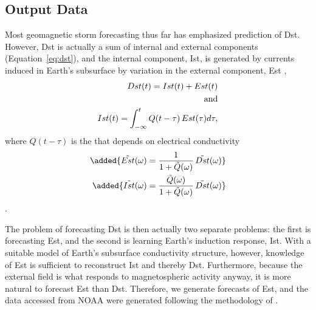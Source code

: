 \subsection{Output Data}
Most geomagnetic storm forecasting thus far has emphasized prediction of Dst. However, Dst is actually a sum of internal and external components (Equation~\ref{eq:dst}), and the internal component, Ist, is generated by currents induced in Earth's subsurface by variation in the external component, Est \citep{Maus2004} ,
\begin{eqnarray}
    Dst(t) = Ist(t) + Est(t) \label{eq:dst}\\
    \textnormal{and}\nonumber \\
    Ist(t) = \int_{-\infty}^t Q(t-\tau)\,Est(\tau) d\tau \label{eq:ist},
\end{eqnarray}
where $Q(t-\tau)$ is the  that depends on  electrical conductivity \added{$\sigma$}
\begin{eqnarray}
    \added{\tilde{Est}(\omega) = \frac{1}{1+\tilde{Q}(\omega)}\,\tilde{Dst}(\omega)} \\
    \added{\tilde{Ist}(\omega) = \frac{\tilde{Q}(\omega)}{1+\tilde{Q}(\omega)}\,\tilde{Dst}(\omega)}
\end{eqnarray}
 \cite{Maus2004, Olsen2005, Grayver2020}.

The problem of forecasting Dst is then actually two separate problems: the first is forecasting Est, and the second is learning Earth's induction response, Ist. With a suitable model of Earth's subsurface conductivity structure, however, knowledge of Est is sufficient to reconstruct Ist and thereby Dst. Furthermore, because the external field is what responds to magnetospheric activity anyway, it is more natural to forecast Est than Dst. Therefore, we generate forecasts of Est, and the data accessed from NOAA were generated following the methodology of \cite{Maus2004} . 

